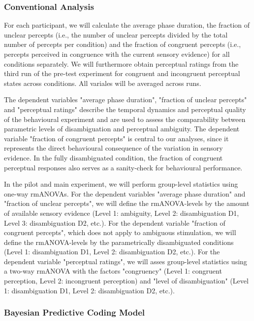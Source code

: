 \documentclass[12pt]{article}
\begin{document}
\subsubsection{Conventional Analysis}

For each participant, we will calculate the average phase duration, the fraction of unclear percepts (i.e., the number of unclear percepts divided by the total number of percepts per condition) and the fraction of congruent percepts (i.e., percepts perceived in congruence with the current sensory evidence) for all conditions separately. We will furthermore obtain perceptual ratings from the third run of the pre-test experiment for congruent and incongruent perceptual states across conditions.  All variales will be averaged across runs.  

The dependent variables "average phase duration", "fraction of unclear percepts" and "perceptual ratings" describe the temporal dynamics and perceptual quality of the behavioural experiment and are used to assess the comparability between parametric levels of disambiguation and perceptual ambiguity. The dependent variable "fraction of congruent percepts" is central to our analyses, since it represents the direct behavioural consequence of the variation in sensory evidence. In the fully disambiguated condition, the fraction of congruent perceptual responses also serves as a sanity-check for behavioural performance.

In the pilot and main experiment, we will perform group-level statistics using one-way rmANOVAs. For the dependent variables "average phase duration" and "fraction of unclear percepts", we will define the rmANOVA-levels by the amount of available sensory evidence (Level 1: ambiguity, Level 2: disambiguation D1, Level 3: disambiguation D2, etc.). For the dependent variable "fraction of congruent percepts", which does not apply to ambiguous stimulation, we will define the rmANOVA-levels by the parametrically disambiguated conditions (Level 1: disambiguation D1, Level 2: disambiguation D2, etc.). For the dependent variable "perceptual ratings", we will asses group-level statistics using a two-way rmANOVA with the factors "congruency" (Level 1: congruent perception, Level 2: incongruent perception) and "level of disambiguation" (Level 1: disambiguation D1, Level 2: disambiguation D2, etc.).

\subsubsection{Bayesian Predictive Coding Model}
\end{document}
